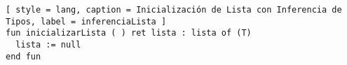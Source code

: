 \begin{lstlisting}[ style = lang, caption = Inicialización de Lista con Inferencia de Tipos, label = inferenciaLista ]
fun inicializarLista ( ) ret lista : lista of (T)
  lista := null
end fun
\end{lstlisting}
\fi

\fi

\iffalse


Este concepto permitiría deducir el tipo de la constante, sin necesidad de modificar la sintaxis del lenguaje pero complicando el chequeo de tipos del intérprete.
\fi

\iffalse
\subsection{Forzar Indentación}
\subsection{Phantom Types}
\fi